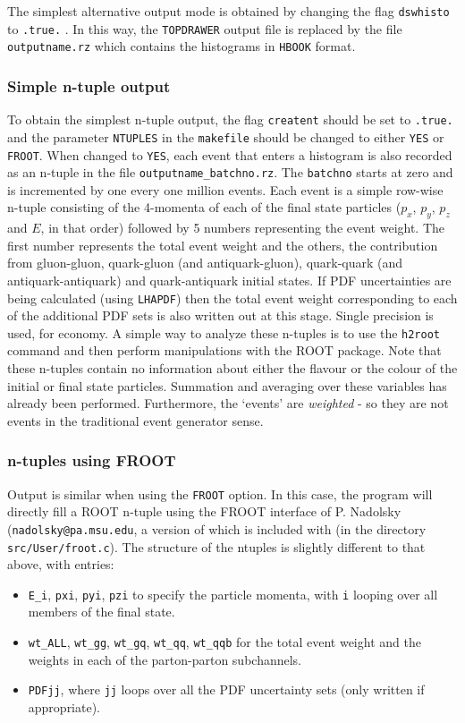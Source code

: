 \documentclass{article}
\begin{document}
The simplest alternative output mode is obtained by changing the flag
{\tt dswhisto} to {\tt .true.} . In this way, the {\tt TOPDRAWER} output file is
replaced by the file {\tt outputname.rz} which contains the histograms in {\tt HBOOK}
format.

\subsubsection{Simple n-tuple output}
To obtain the simplest n-tuple output, the flag {\tt creatent} should be set
to {\tt .true.} and the parameter {\tt NTUPLES} in the {\tt makefile} should be changed
to either {\tt YES} or {\tt FROOT}. When changed to {\tt YES}, each event that enters a histogram
is also recorded as an n-tuple in the file {\tt outputname\_batchno.rz}. The {\tt batchno}
starts at zero and is incremented by one every one million events. Each event
is a simple row-wise n-tuple consisting of the 4-momenta of each of the final
state particles ($p_x$, $p_y$, $p_z$ and $E$, in that order) followed by 5 numbers
representing the event weight. The first number represents the total event weight
and the others, the contribution from gluon-gluon, quark-gluon (and antiquark-gluon),
quark-quark (and antiquark-antiquark) and quark-antiquark initial states. If
PDF uncertainties are being calculated (using {\tt LHAPDF}) then the total event weight
corresponding to each of the additional PDF sets is also written out at this stage.
Single precision is used, for economy. A simple way to analyze 
these n-tuples is to use the {\tt h2root} command and then perform
manipulations with the ROOT package. Note that these n-tuples contain
no information about either the flavour or the colour of the initial or final
state particles. Summation and averaging over these variables has already been
performed. Furthermore, the `events' are {\it weighted} - so they are not events
in the traditional event generator sense.

\subsubsection{n-tuples using FROOT}
Output is similar when using the {\tt FROOT} option. In this case, the program will directly
fill a ROOT n-tuple using the FROOT interface of P. Nadolsky ({\tt nadolsky@pa.msu.edu}, a version
of which is included with \MCFM (in the directory {\tt src/User/froot.c}). The structure
of the ntuples is slightly different to that above, with entries:
\begin{itemize}
\item {\tt E\_i}, {\tt pxi}, {\tt pyi}, {\tt pzi} to specify the particle momenta, with {\tt i}
 looping over all members of the final state.
\item {\tt wt\_ALL}, {\tt wt\_gg}, {\tt wt\_gq}, {\tt wt\_qq}, {\tt wt\_qqb} for the total event
 weight and the weights in each of the parton-parton subchannels.
\item {\tt PDFjj}, where {\tt jj} loops over all the PDF uncertainty sets (only written if
 appropriate).
\end{itemize}
\end{document}
